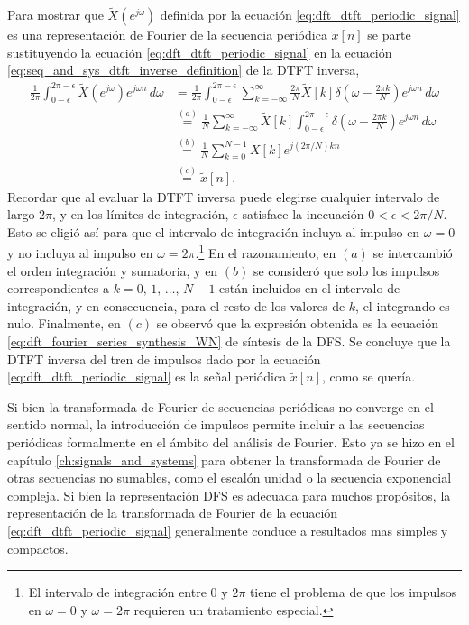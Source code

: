 \documentclass[a4paper]{report}
\begin{document}
Para mostrar que \(\tilde{X}(e^{j\omega})\) definida por la ecuación \ref{eq:dft_dtft_periodic_signal} es una representación de Fourier de la secuencia periódica \(\tilde{x}[n]\) se parte sustituyendo la ecuación \ref{eq:dft_dtft_periodic_signal} en la ecuación \ref{eq:seq_and_sys_dtft_inverse_definition} de la DTFT inversa,
\begin{align*}
 \frac{1}{2\pi}\int_{0-\epsilon}^{2\pi-\epsilon}\tilde{X}(e^{j\omega})e^{j\omega n}\,d\omega
  &=\frac{1}{2\pi}\int_{0-\epsilon}^{2\pi-\epsilon}\sum_{k=-\infty}^\infty\frac{2\pi}{N}\tilde{X}[k]\delta\left(\omega-\frac{2\pi k}{N}\right)e^{j\omega n}\,d\omega\\
  &\overset{(a)}{=}\frac{1}{N}\sum_{k=-\infty}^\infty\tilde{X}[k]\int_{0-\epsilon}^{2\pi-\epsilon}\delta\left(\omega-\frac{2\pi k}{N}\right)e^{j\omega n}\,d\omega\\
  &\overset{(b)}{=}\frac{1}{N}\sum_{k=0}^{N-1}\tilde{X}[k]e^{j(2\pi/N)kn}\\
  &\overset{(c)}{=}\tilde{x}[n].
\end{align*}
Recordar que al evaluar la DTFT inversa puede elegirse cualquier intervalo de largo \(2\pi\), y en los límites de integración, \(\epsilon\) satisface la inecuación \(0<\epsilon<2\pi/N\). Esto se eligió así para que el intervalo de integración incluya al impulso en \(\omega=0\) y no incluya al impulso en \(\omega=2\pi\).\footnote{El intervalo de integración entre 0 y \(2\pi\) tiene el problema de que los impulsos en \(\omega=0\) y \(\omega=2\pi\) requieren un tratamiento especial.} En el razonamiento, en \((a)\) se intercambió el orden integración y sumatoria, y en \((b)\) se consideró que solo los impulsos correspondientes a \(k=0,\,1,\,\dots,\,N-1\) están incluidos en el intervalo de integración, y en consecuencia, para el resto de los valores de \(k\), el integrando es nulo. Finalmente, en \((c)\) se observó que la expresión obtenida es la ecuación \ref{eq:dft_fourier_series_synthesis_WN} de síntesis de la DFS. Se concluye que la DTFT inversa del tren de impulsos dado por la ecuación \ref{eq:dft_dtft_periodic_signal} es la señal periódica \(\tilde{x}[n]\), como se quería.

Si bien la transformada de Fourier de secuencias periódicas no converge en el sentido normal, la introducción de impulsos permite incluir a las secuencias periódicas formalmente en el ámbito del análisis de Fourier. Esto ya se hizo en el capítulo \ref{ch:signals_and_systems} para obtener la transformada de Fourier de otras secuencias no sumables, como el escalón unidad o la secuencia exponencial compleja. Si bien la representación DFS es adecuada para muchos propósitos, la representación de la transformada de Fourier de la ecuación \ref{eq:dft_dtft_periodic_signal} generalmente conduce a resultados mas simples y compactos.
\end{document}
